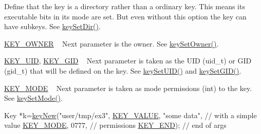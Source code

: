 \begin{DoxyRefList}
\begin{DoxyItemize}
 Define that the key is a directory rather than a ordinary key. This means its executable bits in its mode are set. But even without this option the key can have subkeys. See \hyperlink{group__meta_gaae575bd86a628a15ee45baa860522e75}{key\+Set\+Dir()}.
\item \hyperlink{group__key_gga91fb3178848bd682000958089abbaf40a77ca60362fa8daca8d5347db4385068b}{K\+E\+Y\+\_\+\+O\+W\+N\+E\+R} ~\newline
 Next parameter is the owner. See \hyperlink{owner_8c_a88d6ec200ba0707b7c1b4a88133d2be4}{key\+Set\+Owner()}.
\item \hyperlink{group__key_gga91fb3178848bd682000958089abbaf40a28f01a87d65f065172f734c9c9446c0e}{K\+E\+Y\+\_\+\+U\+I\+D}, \hyperlink{group__key_gga91fb3178848bd682000958089abbaf40ac0628bbaba7c837ca73323681393d15f}{K\+E\+Y\+\_\+\+G\+I\+D} ~\newline
 Next parameter is taken as the U\+I\+D (uid\+\_\+t) or G\+I\+D (gid\+\_\+t) that will be defined on the key. See \hyperlink{group__meta_gab5f284f5ecd261e0a290095f50ba1af7}{key\+Set\+U\+I\+D()} and \hyperlink{group__meta_ga9e3d0fb3f7ba906e067727b9155d22e3}{key\+Set\+G\+I\+D()}.
\item \hyperlink{group__key_gga91fb3178848bd682000958089abbaf40a1b0a91ff3a855d6993930ebf0abaa518}{K\+E\+Y\+\_\+\+M\+O\+D\+E} ~\newline
 Next parameter is taken as mode permissions (int) to the key. See \hyperlink{group__meta_ga8803037e35b9da1ce492323a88ff6bc3}{key\+Set\+Mode()}. 
\begin{DoxyCodeInclude}
Key *k=\hyperlink{group__key_gad23c65b44bf48d773759e1f9a4d43b89}{keyNew}(\textcolor{stringliteral}{"user/tmp/ex3"},
        \hyperlink{group__key_gga91fb3178848bd682000958089abbaf40ac66e4a49d09212b79f5754ca6db5bd2e}{KEY\_VALUE}, \textcolor{stringliteral}{"some data"},    \textcolor{comment}{// with a simple value}
        \hyperlink{group__key_gga91fb3178848bd682000958089abbaf40a1b0a91ff3a855d6993930ebf0abaa518}{KEY\_MODE}, 0777,            \textcolor{comment}{// permissions}
        \hyperlink{group__key_gga91fb3178848bd682000958089abbaf40aa8adb6fcb92dec58fb19410eacfdd403}{KEY\_END});                  \textcolor{comment}{// end of args}
\end{DoxyCodeInclude}


\end{DoxyItemize}
\end{DoxyRefList}
